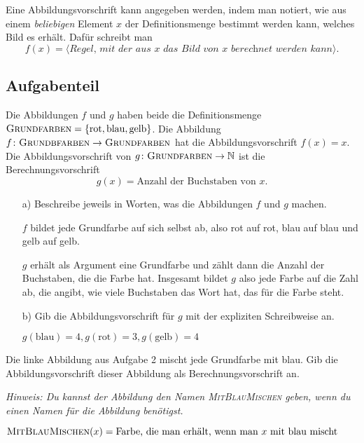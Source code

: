 \documentclass[]{uebungsblatt}
\begin{document}
\begin{remark}
    Eine Abbildungsvorschrift kann angegeben werden, indem man notiert, wie aus einem \emph{beliebigen} Element $x$ der Definitionsmenge bestimmt werden kann, welches Bild es erhält. Dafür schreibt man
    \[f(x)=\langle\textit{Regel, mit der aus $x$ das Bild von $x$ berechnet werden kann}\rangle.\]
\end{remark}

\subsection*{Aufgabenteil}
\begin{exercise}
    Die Abbildungen $f$ und $g$ haben beide die Definitionsmenge 
    $\textsc{Grundfarben}=\{\text{rot},\text{blau},\text{gelb}\}$. Die Abbildung 
    $f\colon\textsc{Grundbfarben}\rightarrow\textsc{Grundfarben}$ hat die Abbildungsvorschrift $f(x)=x$.
    Die Abbildungsvorschrift von $g\colon\textsc{Grundfarben}\rightarrow\mathbb{N}$ ist die Berechnungsvorschrift \[g(x)=\text{Anzahl der Buchstaben von $x$}.\] 
    
    \begin{enumerate}
        \item[a)] Beschreibe jeweils in Worten, was die Abbildungen $f$ und $g$ machen.
        \begin{answerbox}[1in]
            $f$ bildet jede Grundfarbe auf sich selbst ab, also rot auf rot, blau auf blau und gelb auf gelb.
            
            $g$ erhält als Argument eine Grundfarbe und zählt dann die Anzahl der Buchstaben, die die Farbe hat. Insgesamt bildet $g$ also jede Farbe auf die Zahl ab, die angibt, wie viele Buchstaben das Wort hat, das für die Farbe steht.
        \end{answerbox}
        \item[b)] Gib die Abbildungsvorschrift für $g$ mit der expliziten Schreibweise an.
        \begin{answerbox}[0.5in]
            $g(\text{blau})=4, g(\text{rot})=3, g(\text{gelb})=4$
        \end{answerbox}
    \end{enumerate}
\end{exercise}
\begin{exercise}
    Die linke Abbildung aus Aufgabe 2 mischt jede Grundfarbe mit blau. Gib die Abbildungsvorschrift dieser Abbildung als Berechnungsvorschrift an.
    
    \emph{Hinweis: Du kannst der Abbildung den Namen \textsc{MitBlauMischen} geben, wenn du einen Namen für die Abbildung benötigst.}
    \begin{answerbox}[0.5in]
        $\textsc{MitBlauMischen}(x)=\text{Farbe, die man erhält, wenn man}~x~\text{mit blau mischt}$
    \end{answerbox}
\end{exercise}
\end{document}
